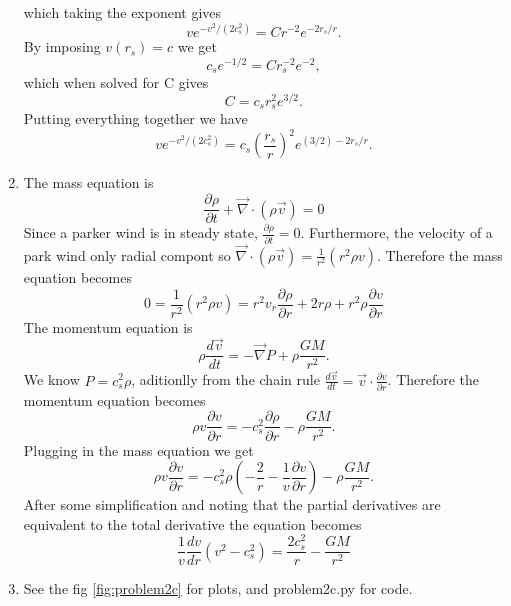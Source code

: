 \documentclass[11pt]{article}
\begin{document}
\begin{enumerate}[label=\alph*)]
\begin{equation}
  \end{equation}
  which taking the exponent gives
  \begin{equation}
   v e^{-v^2/(2c_s^2)} = Cr^{-2}e^{-2r_s/r}.
  \end{equation}
  By imposing  $v(r_s) = c$ we get
  \begin{equation}
   c_s e^{-1/2} = C r_s^{-2}e^{-2},
  \end{equation}
  which when solved for C gives
  \begin{equation}
   C = c_s r_s^2 e^{3/2}.
  \end{equation}
  Putting everything together we have
  \begin{equation}
   v e^{-v^2/(2c_s^2)} = c_s \left( \frac{r_s}{r} \right)^2 e^{(3/2) - 2r_s/r }.
  \end{equation}
 \item
  The mass equation is
  \begin{equation}
   \frac{\partial \rho}{\partial t} + \vec{\nabla} \cdot (\rho \vec{v}) = 0
  \end{equation}
  Since a parker wind is in steady state, $\frac{\partial \rho}{\partial t} = 0$.
  Furthermore, the velocity of a park wind only radial compont so $\vec{\nabla} \cdot (\rho \vec{v}) = \frac{1}{r^2} (r^2 \rho v)$.
  Therefore the mass equation becomes
  \begin{equation}
    0 = \frac{1}{r^2} (r^2 \rho v) = r^2 v_r \frac{\partial \rho}{\partial r} + 2 r \rho + r^2 \rho \frac{\partial v}{\partial r}
  \end{equation}
  The momentum equation is
  \begin{equation}
   \rho \frac{d \vec{v}}{d t} = - \vec{\nabla} P + \rho \frac{GM}{r^2}.
  \end{equation}
  We know $P = c_s^2 \rho$, aditionlly from the chain rule $\frac{d \vec{v}}{dt} = \vec{v} \cdot \frac{\partial v}{\partial r}$.
  Therefore the momentum equation becomes
  \begin{equation}
   \rho v \frac{\partial v}{\partial r} = -c_s^2 \frac{\partial \rho}{\partial r} - \rho \frac{GM}{r^2} .
  \end{equation}
  Plugging in the mass equation we get
  \begin{equation}
   \rho v \frac{\partial v}{\partial r} = -c_s^2 \rho (-\frac{2}{r} - \frac{1}{v}\frac{\partial v}{\partial r} )  - \rho \frac{GM}{r^2} .
  \end{equation}
  After some simplification and noting that the partial derivatives are equivalent to the total derivative the equation becomes
  \begin{equation}
   \frac{1}{v} \frac{d v}{dr} (v^2 - c_s^2) = \frac{2 c_s^2}{r} - \frac{G M}{r^2}
  \end{equation}
 \item
  See the fig \ref{fig:problem2c} for plots, and problem2c.py for code.


\end{enumerate}
\end{document}
